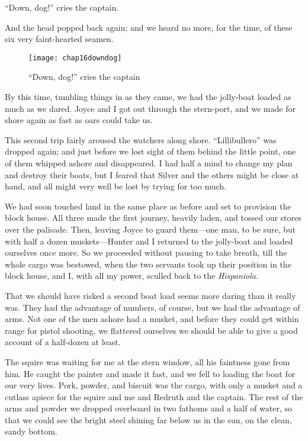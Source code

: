 \enquote{Down, dog!} cries the captain.

And the head popped back again; and we heard no more, for the time, of these six very faint-hearted seamen.

  \begin{figure}[p]
\centering
\texttt{[image: chap16downdog]}
\caption{\enquote{Down, dog!} cries the captain}
\end{figure} 

By this time, tumbling things in as they came, we had the jolly-boat loaded as much as we dared. Joyce and I got out through the stern-port, and we made for shore again as fast as oars could take us.

This second trip fairly aroused the watchers along shore. \enquote{Lillibullero} was dropped again; and just before we lost sight of them behind the little point, one of them whipped ashore and disappeared. I had half a mind to change my plan and destroy their boats, but I feared that Silver and the others might be close at hand, and all might very well be lost by trying for too much.

We had soon touched land in the same place as before and set to provision the block house. All three made the first journey, heavily laden, and tossed our stores over the palisade. Then, leaving Joyce to guard them---one man, to be sure, but with half a dozen muskets---Hunter and I returned to the jolly-boat and loaded ourselves once more. So we proceeded without pausing to take breath, till the whole cargo was bestowed, when the two servants took up their position in the block house, and I, with all my power, sculled back to the \textit{Hispaniola}.

That we should have risked a second boat load seems more daring than it really was. They had the advantage of numbers, of course, but we had the advantage of arms. Not one of the men ashore had a musket, and before they could get within range for pistol shooting, we flattered ourselves we should be able to give a good account of a half-dozen at least.

The squire was waiting for me at the stern window, all his faintness gone from him. He caught the painter and made it fast, and we fell to loading the boat for our very lives. Pork, powder, and biscuit was the cargo, with only a musket and a cutlass apiece for the squire and me and Redruth and the captain. The rest of the arms and powder we dropped overboard in two fathoms and a half of water, so that we could see the bright steel shining far below us in the sun, on the clean, sandy bottom.

